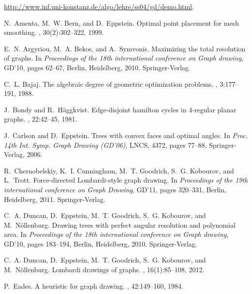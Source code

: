 \documentclass[10pt]{article}
\begin{document}

\begin{thebibliography}{99}

\url{http://www.inf.uni-konstanz.de/algo/lehre/ss04/gd/demo.html}.

N.~Amenta, M.~W. Bern, and D.~Eppstein.
\newblock Optimal point placement for mesh smoothing.
, 30(2):302--322, 1999.

E.~N. Argyriou, M.~A. Bekos, and A.~Symvonis.
\newblock Maximizing the total resolution of graphs.
\newblock In {\em Proceedings of the 18th international conference on Graph
  drawing}, GD'10, pages 62--67, Berlin, Heidelberg, 2010. Springer-Verlag.

C.~L. Bajaj.
\newblock The algebraic degree of geometric optimization problems.
, 3:177--191, 1988.

J.~Bondy and R.~H{\" a}ggkvist.
\newblock Edge-disjoint hamilton cycles in 4-regular planar graphs.
, 22:42--45, 1981.

J.~Carlson and D.~Eppstein.
\newblock Trees with convex faces and optimal angles.
\newblock In {\em Proc. 14th Int. Symp. Graph Drawing (GD'06)}, LNCS, 4372,
  pages 77--88. Springer-Verlag, 2006.

R.~Chernobelskiy, K.~I. Cunningham, M.~T. Goodrich, S.~G. Kobourov, and
  L.~Trott.
\newblock Force-directed {L}ombardi-style graph drawing.
\newblock In {\em Proceedings of the 19th international conference on Graph
  Drawing}, GD'11, pages 320--331, Berlin, Heidelberg, 2011. Springer-Verlag.

C.~A. Duncan, D.~Eppstein, M.~T. Goodrich, S.~G. Kobourov, and
  M.~N\"{o}llenburg.
\newblock Drawing trees with perfect angular resolution and polynomial area.
\newblock In {\em Proceedings of the 18th international conference on Graph
  drawing}, GD'10, pages 183--194, Berlin, Heidelberg, 2010. Springer-Verlag.

C.~A. Duncan, D.~Eppstein, M.~T. Goodrich, S.~G. Kobourov, and
  M.~N\"{o}llenburg.
\newblock Lombardi drawings of graphs.
, 16(1):85--108,
  2012.

P.~Eades.
\newblock A heuristic for graph drawing.
, 42:149--160, 1984.


\end{thebibliography}
\end{document}
